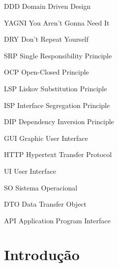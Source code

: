 \documentclass[12pt, %
openright, 
oneside, %
a4paper,    %
brazil]{facom-ufu-abntex2}
\begin{document}
\begin{siglas} %
    \item[DDD] Domain Driven Design
    \item[YAGNI] You Aren't Gonna Need It
    \item[DRY] Don't Repeat Yourself
    \item[SRP] Single Responsibility Principle
    \item[OCP] Open-Closed Principle
    \item[LSP] Liskov Substitution Principle
    \item[ISP] Interface Segregation Principle
    \item[DIP] Dependency Inversion Principle
    \item[GUI] Graphic User Interface
    \item[HTTP] Hypertext Transfer Protocol
    \item[UI] User Interface
    \item[SO] Sistema Operacional
    \item[DTO] Data Transfer Object
    \item[API] Application Program Interface
\end{siglas}


\tableofcontents*
\cleardoublepage





\textual



\chapter[Introdução]{Introdução} \label{chapt:introduction}
\end{document}
